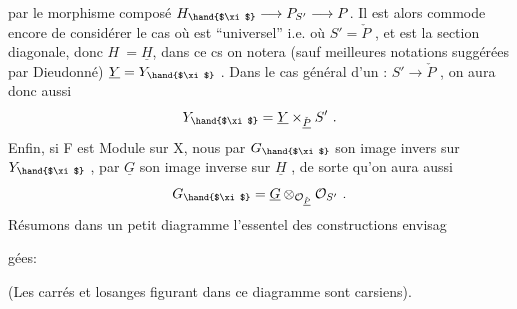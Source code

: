 
par le morphisme composé $H_{\hand{$\xi$}} \longrightarrow P_{S'} \longrightarrow P$. Il est alors commode
 encore de considérer le cas où \hand{$\xi$} est
``universel'' i.e. où $S' = \check{P}$ , et \hand{$\xi$} est la section diagonale, donc $H \ = \underline{H}$,
dans ce cs on notera (sauf meilleures notations suggérées par Dieudonné)
$\underline{Y} = Y_{\hand{$\xi$}}$ . Dans le cas général d'un \hand{$\xi$}: $S' \to \check{P}$ , on aura donc aussi
\[ Y_{\hand{$\xi$}} = \underline{Y} \times_{\check{\underline{P}}} S' \ . \]
Enfin, si F est Module sur X, nous  par $G_{\hand{$\xi$}}$ son image invers
sur $Y_{\hand{$\xi$}}$ , par $\underline{G}$ son image inverse sur $\underline{H}$ , de sorte qu'on aura aussi
\[ G_{\hand{$\xi$}} = \underline{G} \otimes_{\mathcal{O}_{\check{\underline{P}}}} \mathcal{O}_{S'} \ . \]
Résumons dans un petit diagramme l'essentel des constructions  envisag

gées:

(Les carrés et losanges figurant dans ce diagramme sont carsiens).

